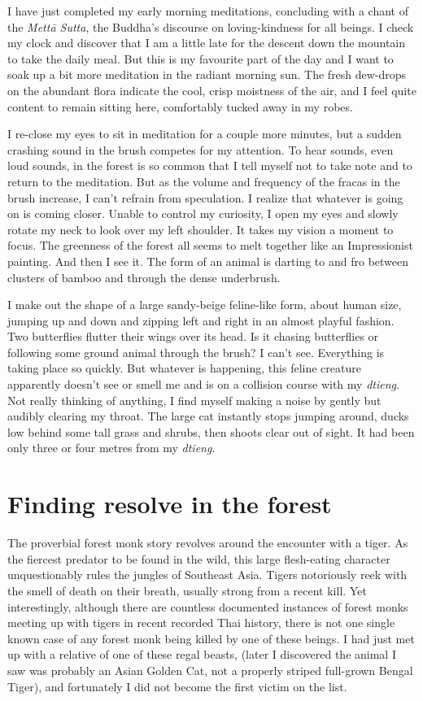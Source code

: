I have just completed my early morning meditations, concluding with a
chant of the \emph{Mettā Sutta}, the Buddha's discourse on
loving-kindness for all beings. I check my clock and discover that I am
a little late for the descent down the mountain to take the daily meal. 
But this is my favourite part of the day and I want to soak up a bit
more meditation in the radiant morning sun. The fresh dew-drops on the
abundant flora indicate the cool, crisp moistness of the air, and I feel
quite content to remain sitting here, comfortably tucked away in my
robes. 

I re-close my eyes to sit in meditation for a couple more minutes, but a
sudden crashing sound in the brush competes for my attention. To hear
sounds, even loud sounds, in the forest is so common that I tell myself
not to take note and to return to the meditation. But as the volume and
frequency of the fracas in the brush increase, I can't refrain from
speculation. I realize that whatever is going on is coming closer. 
Unable to control my curiosity, I open my eyes and slowly rotate my neck
to look over my left shoulder. It takes my vision a moment to focus. The
greenness of the forest all seems to melt together like an Impressionist
painting. And then I see it. The form of an animal is darting to and fro
between clusters of bamboo and through the dense underbrush.

I make out
the shape of a large sandy-beige feline-like form, about human size, 
jumping up and down and zipping left and right in an almost playful
fashion. Two butterflies flutter their wings over its head. Is it
chasing butterflies or following some ground animal through the brush? I
can't see. Everything is taking place so quickly. But whatever is
happening, this feline creature apparently doesn't see or smell me and
is on a collision course with my \emph{dtieng}. Not really thinking of
anything, I find myself making a noise by gently but audibly clearing my
throat. The large cat instantly stops jumping around, ducks low behind
some tall grass and shrubs, then shoots clear out of sight. It had been
only three or four metres from my \emph{dtieng}. 

\section{Finding resolve in the forest}

The proverbial forest monk story revolves around the encounter with a
tiger. As the fiercest predator to be found in the wild, this large
flesh-eating character unquestionably rules the jungles of Southeast
Asia. Tigers notoriously reek with the smell of death on their breath, 
usually strong from a recent kill. Yet interestingly, although there are
countless documented instances of forest monks meeting up with tigers in
recent recorded Thai history, there is not one single known case of any
forest monk being killed by one of these beings. I had just met up with
a relative of one of these regal beasts, (later I discovered the animal
I saw was probably an Asian Golden Cat, not a properly striped
full-grown Bengal Tiger), and fortunately I did not become the first
victim on the list. 


